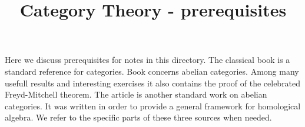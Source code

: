 



\title{Category Theory - prerequisites}
\date{}
\maketitle
\noindent
Here we discuss prerequisites for notes in this directory. The classical book \cite{Maclane} is a standard reference for categories. Book \cite{freyd1962abelian} concerns abelian categories. Among many usefull results and interesting exercises it also contains the proof of the celebrated Freyd-Mitchell theorem. The article \cite{grothendieck1957} is another standard work on abelian categories. It was written in order to provide a general framework for homological algebra. We refer to the specific parts of these three sources when needed. 
\small


